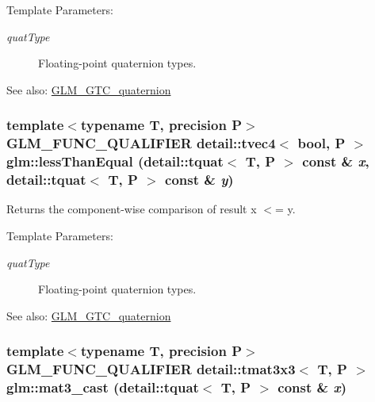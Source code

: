 \begin{Desc}
\item[Template Parameters:]
\begin{description}
\item[{\em quatType}]Floating-point quaternion types.\end{description}
\end{Desc}
\begin{Desc}
\item[See also:]\hyperlink{group__gtc__quaternion}{GLM\_\-GTC\_\-quaternion} \end{Desc}
\hypertarget{group__gtc__quaternion_g43f2f8f0e9b252966c72f357fc834184}{
\subsubsection[lessThanEqual]{\setlength{\rightskip}{0pt plus 5cm}template$<$typename T, precision P$>$ GLM\_\-FUNC\_\-QUALIFIER detail::tvec4$<$ bool, P $>$ glm::lessThanEqual (detail::tquat$<$ T, P $>$ const \& {\em x}, \/  detail::tquat$<$ T, P $>$ const \& {\em y})}}
\label{group__gtc__quaternion_g43f2f8f0e9b252966c72f357fc834184}


Returns the component-wise comparison of result x $<$= y.

\begin{Desc}
\item[Template Parameters:]
\begin{description}
\item[{\em quatType}]Floating-point quaternion types.\end{description}
\end{Desc}
\begin{Desc}
\item[See also:]\hyperlink{group__gtc__quaternion}{GLM\_\-GTC\_\-quaternion} \end{Desc}
\hypertarget{group__gtc__quaternion_gbbfeeb474bc34d9c73cfdc8af78cfb8b}{
\subsubsection[mat3\_\-cast]{\setlength{\rightskip}{0pt plus 5cm}template$<$typename T, precision P$>$ GLM\_\-FUNC\_\-QUALIFIER detail::tmat3x3$<$ T, P $>$ glm::mat3\_\-cast (detail::tquat$<$ T, P $>$ const \& {\em x})}}
\label{group__gtc__quaternion_gbbfeeb474bc34d9c73cfdc8af78cfb8b}



